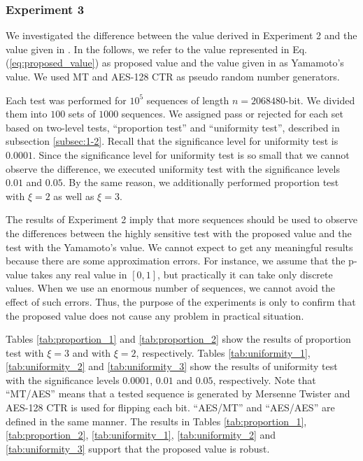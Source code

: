 \documentclass[dvipdfmx,english]{ampmt} %
\begin{document}
\subsubsection{Experiment 3}
We investigated the difference between the value derived in Experiment 2 and the value given in \cite{yamamoto2016highly}. In the follows, we refer to the value represented in Eq. (\ref{eq:proposed_value}) as proposed value and the value given in \cite{yamamoto2016highly} as Yamamoto's value. We used MT \cite{matsumoto1998mersenne} and AES-128 CTR \cite{rijmen2001advanced} as pseudo random number generators. 
\par
Each test was performed for $10^5$ sequences of length $n=2068480$-bit. We divided them into $100$ sets of $1000$ sequences. We assigned pass or rejected for each set based on two-level tests, ``proportion test'' and ``uniformity test'', described in subsection \ref{subsec:1-2}.
%
Recall that the significance level for uniformity test is $0.0001$. 
Since the significance level for uniformity test is so small that we cannot observe the difference, we executed uniformity test with the significance levels $0.01$ and $0.05$.
By the same reason, we additionally performed proportion test with $\xi=2$ as well as $\xi=3$.
\par
The results of Experiment 2 imply that more sequences should be used to observe the differences between the highly sensitive test with the proposed value and the test with the Yamamoto's value. We cannot expect to get any meaningful results because there are some approximation errors. For instance, we assume that the p-value takes any real value in $[0,1]$, but practically it can take only discrete values. When we use an enormous number of sequences, we cannot avoid the effect of such errors.
%
Thus, the purpose of the experiments is only to confirm that the proposed value does not cause any problem in practical situation.
\par
Tables \ref{tab:proportion_1} and \ref{tab:proportion_2} show the results of proportion test with $\xi=3$ and with $\xi=2$, respectively. Tables \ref{tab:uniformity_1}, \ref{tab:uniformity_2} and \ref{tab:uniformity_3} show the results of uniformity test with the significance levels $0.0001$, $0.01$ and $0.05$, respectively. Note that ``MT/AES'' means that a tested sequence is generated by Mersenne Twister and AES-128 CTR is used for flipping each bit. ``AES/MT'' and ``AES/AES'' are defined in the same manner.
The results in Tables \ref{tab:proportion_1}, \ref{tab:proportion_2}, \ref{tab:uniformity_1}, \ref{tab:uniformity_2} and \ref{tab:uniformity_3} support that the proposed value is robust.
\end{document}
